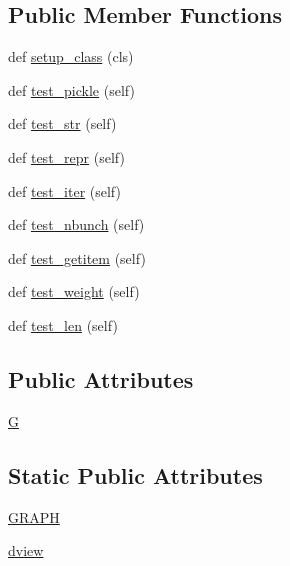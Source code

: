 \subsection*{Public Member Functions}
\begin{DoxyCompactItemize}
\item 
def \hyperlink{classnetworkx_1_1classes_1_1tests_1_1test__reportviews_1_1TestDegreeView_afb632b2ec9383bb1114ebe04ba2689b4}{setup\+\_\+class} (cls)
\item 
def \hyperlink{classnetworkx_1_1classes_1_1tests_1_1test__reportviews_1_1TestDegreeView_a88e4b266ca5e90f18800e85b138c49b0}{test\+\_\+pickle} (self)
\item 
def \hyperlink{classnetworkx_1_1classes_1_1tests_1_1test__reportviews_1_1TestDegreeView_a3a5f281ab6dc1b607506a074d72c3064}{test\+\_\+str} (self)
\item 
def \hyperlink{classnetworkx_1_1classes_1_1tests_1_1test__reportviews_1_1TestDegreeView_a5cb0c178424a9fef9b3dba022c7be396}{test\+\_\+repr} (self)
\item 
def \hyperlink{classnetworkx_1_1classes_1_1tests_1_1test__reportviews_1_1TestDegreeView_a1a96b383e1e8fc7640adff2d2da1b6df}{test\+\_\+iter} (self)
\item 
def \hyperlink{classnetworkx_1_1classes_1_1tests_1_1test__reportviews_1_1TestDegreeView_a5885b8afa89fb53d57a261b47bd9c8d8}{test\+\_\+nbunch} (self)
\item 
def \hyperlink{classnetworkx_1_1classes_1_1tests_1_1test__reportviews_1_1TestDegreeView_a16d35cd40fd916bf6836d472ec446f49}{test\+\_\+getitem} (self)
\item 
def \hyperlink{classnetworkx_1_1classes_1_1tests_1_1test__reportviews_1_1TestDegreeView_aced959dee4903cfcaa660fb7e92681dd}{test\+\_\+weight} (self)
\item 
def \hyperlink{classnetworkx_1_1classes_1_1tests_1_1test__reportviews_1_1TestDegreeView_abaaaac4701e67d87e95076d465c5fd89}{test\+\_\+len} (self)
\end{DoxyCompactItemize}
\subsection*{Public Attributes}
\begin{DoxyCompactItemize}
\item 
\hyperlink{classnetworkx_1_1classes_1_1tests_1_1test__reportviews_1_1TestDegreeView_aa1d9361b387f009673dfac8d1a74767c}{G}
\end{DoxyCompactItemize}
\subsection*{Static Public Attributes}
\begin{DoxyCompactItemize}
\item 
\hyperlink{classnetworkx_1_1classes_1_1tests_1_1test__reportviews_1_1TestDegreeView_a30690458604a5f576da216065be5c0f2}{G\+R\+A\+PH}
\item 
\hyperlink{classnetworkx_1_1classes_1_1tests_1_1test__reportviews_1_1TestDegreeView_a3a533490988904286c654600d54c4d23}{dview}
\end{DoxyCompactItemize}


